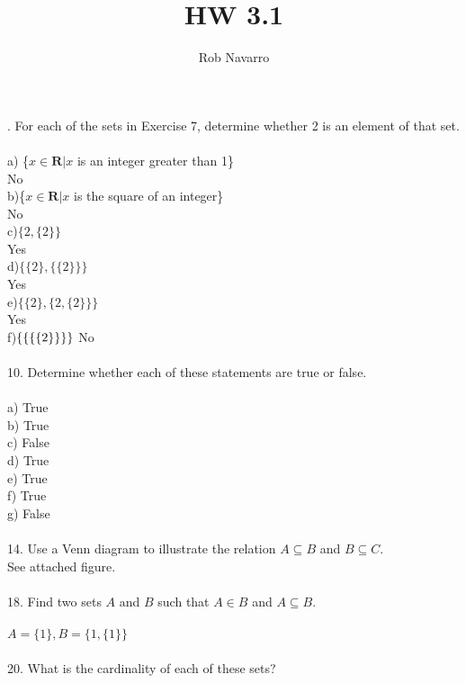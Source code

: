 \documentclass[11pt, oneside]{article}   	%
\title{HW 3.1}
\author{Rob Navarro}
\begin{document}
\maketitle

. For each of the sets in Exercise 7, determine whether {2} is an element of that set.\\\\
a) \{$x \in \textbf{R}|x$ is an integer greater than 1\}\\
No\\
b)\{$x \in \textbf{R}|x$ is the square of an integer\}\\
No\\
c)$\{2,\{2\}\}$\\
Yes\\
d)$\{\{2\},\{\{2\}\}\}$\\
Yes\\
e)$\{\{2\},\{ 2,\{2\}\}\}$\\
Yes\\
f)$\{\{\{\{2\}\}\}\}\\$
No\\\\
10. Determine whether each of these statements are true or false.\\\\
a) True\\
b) True\\
c) False\\
d) True\\
e) True\\
f) True\\
g) False\\\\
14. Use a Venn diagram to illustrate the relation $A\subseteq B$ and $B\subseteq C$.\\
See attached figure.\\\\
18. Find two sets $A$ and $B$ such that $A\in B $ and $ A\subseteq B$.\\\\
$A = \{1\}, B =\{ 1, \{1\}\}$\\\\
20. What is the cardinality of each of these sets?\\\\
\end{document}

